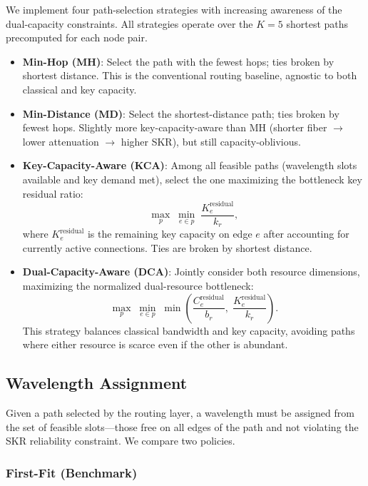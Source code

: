 \documentclass[conference]{IEEEtran}
\begin{document}
We implement four path-selection strategies with increasing awareness of the dual-capacity constraints. All strategies operate over the $K = 5$ shortest paths precomputed for each node pair.

\begin{itemize}
    \item \textbf{Min-Hop (MH)}: Select the path with the fewest hops; ties broken by shortest distance. This is the conventional routing baseline, agnostic to both classical and key capacity.
    \item \textbf{Min-Distance (MD)}: Select the shortest-distance path; ties broken by fewest hops. Slightly more key-capacity-aware than MH (shorter fiber $\to$ lower attenuation $\to$ higher SKR), but still capacity-oblivious.
    \item \textbf{Key-Capacity-Aware (KCA)}: Among all feasible paths (wavelength slots available and key demand met), select the one maximizing the bottleneck key residual ratio:
    \begin{equation}
    \max_{p} \; \min_{e \in p} \; \frac{K_e^{\text{residual}}}{k_r},
    \label{eq:kca}
    \end{equation}
    where $K_e^{\text{residual}}$ is the remaining key capacity on edge $e$ after accounting for currently active connections. Ties are broken by shortest distance.
    \item \textbf{Dual-Capacity-Aware (DCA)}: Jointly consider both resource dimensions, maximizing the normalized dual-resource bottleneck:
    \begin{equation}
    \max_{p} \; \min_{e \in p} \; \min\left( \frac{C_e^{\text{residual}}}{b_r}, \; \frac{K_e^{\text{residual}}}{k_r} \right).
    \label{eq:dca}
    \end{equation}
    This strategy balances classical bandwidth and key capacity, avoiding paths where either resource is scarce even if the other is abundant.
\end{itemize}

\subsection{Wavelength Assignment}

Given a path selected by the routing layer, a wavelength must be assigned from the set of feasible slots---those free on all edges of the path and not violating the SKR reliability constraint. We compare two policies.

\subsubsection{First-Fit (Benchmark)}
\end{document}
